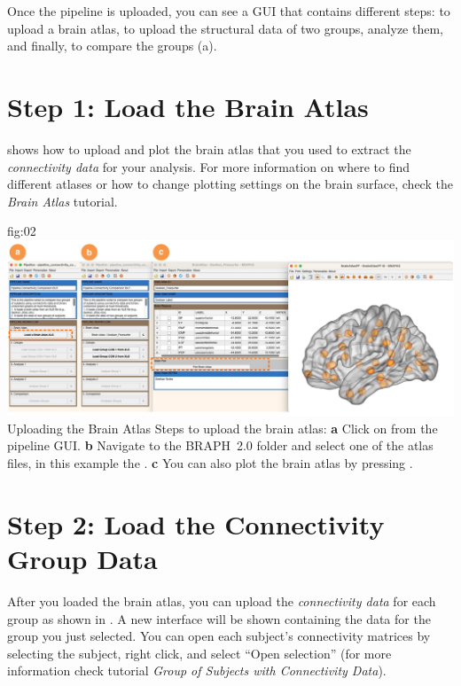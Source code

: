 \documentclass[justified]{tufte-handout}
\begin{document}
Once the pipeline is uploaded, you can see a GUI that contains different steps: to upload a brain atlas, to upload the structural data of two groups, analyze them, and finally, to compare the groups (a). 

\section{Step 1: Load the Brain Atlas}
 shows how to upload and plot the brain atlas that you used to extract the \emph{connectivity data} for your analysis. For more information on where to find different atlases or how to change plotting settings on the brain surface, check the \emph{Brain Atlas} tutorial.

	{fig:02}
	{
	\includegraphics{fig02.jpg}
	}
	{Uploading the Brain Atlas}
	{
	Steps to upload the brain atlas:
	{\bf a} Click on  from the pipeline GUI.
	{\bf b} Navigate to the BRAPH~2.0 folder  and select one of the atlas files, in this example the . {\bf c} You can also plot the brain atlas by pressing . 
	}
 
\section{Step 2: Load the Connectivity Group Data}

After you loaded the brain atlas, you can upload the \emph{connectivity data} for each group as shown in . A new interface will be shown containing the data for the group you just selected. You can open each subject’s connectivity matrices by selecting the subject, right click, and select “Open selection” (for more information check tutorial \emph{Group of Subjects with Connectivity Data}).
	
\end{document}
